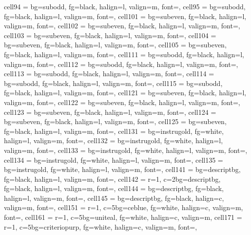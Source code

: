 \documentclass[a4paper,12pt]{article}
\begin{document}
\begin{longtblr}
{  cell{9}{4}  = {bg=subodd,  fg=black, halign=l, valign=m, font=\footnotesize},
  cell{9}{5}  = {bg=subodd,  fg=black, halign=l, valign=m, font=\footnotesize},
  cell{10}{1} = {bg=subeven, fg=black, halign=l, valign=m, font=\footnotesize},
  cell{10}{2} = {bg=subeven, fg=black, halign=l, valign=m, font=\footnotesize},
  cell{10}{3} = {bg=subeven, fg=black, halign=l, valign=m, font=\footnotesize},
  cell{10}{4} = {bg=subeven, fg=black, halign=l, valign=m, font=\footnotesize},
  cell{10}{5} = {bg=subeven, fg=black, halign=l, valign=m, font=\footnotesize},
  cell{11}{1} = {bg=subodd,  fg=black, halign=l, valign=m, font=\footnotesize},
  cell{11}{2} = {bg=subodd,  fg=black, halign=l, valign=m, font=\footnotesize},
  cell{11}{3} = {bg=subodd,  fg=black, halign=l, valign=m, font=\footnotesize},
  cell{11}{4} = {bg=subodd,  fg=black, halign=l, valign=m, font=\footnotesize},
  cell{11}{5} = {bg=subodd,  fg=black, halign=l, valign=m, font=\footnotesize},
  cell{12}{1} = {bg=subeven, fg=black, halign=l, valign=m, font=\footnotesize},
  cell{12}{2} = {bg=subeven, fg=black, halign=l, valign=m, font=\footnotesize},
  cell{12}{3} = {bg=subeven, fg=black, halign=l, valign=m, font=\footnotesize},
  cell{12}{4} = {bg=subeven, fg=black, halign=l, valign=m, font=\footnotesize},
  cell{12}{5} = {bg=subeven, fg=black, halign=l, valign=m, font=\footnotesize},
  cell{13}{1} = {bg=instrugold, fg=white, halign=l, valign=m, font=\footnotesize},
  cell{13}{2} = {bg=instrugold, fg=white, halign=l, valign=m, font=\footnotesize},
  cell{13}{3} = {bg=instrugold, fg=white, halign=l, valign=m, font=\footnotesize},
  cell{13}{4} = {bg=instrugold, fg=white, halign=l, valign=m, font=\footnotesize},
  cell{13}{5} = {bg=instrugold, fg=white, halign=l, valign=m, font=\footnotesize},
  cell{14}{1} = {bg=descriptbg, fg=black, halign=l, valign=m, font=\footnotesize},
  cell{14}{2} = {r=1, c=2}{bg=descriptbg, fg=black, halign=l, valign=m, font=\footnotesize},
  cell{14}{4} = {bg=descriptbg, fg=black, halign=l, valign=m, font=\footnotesize},
  cell{14}{5} = {bg=descriptbg, fg=black, halign=c, valign=m, font=\footnotesize\bfseries},
  cell{15}{1} = {r=1, c=5}{bg=ceblue, fg=white, halign=c, valign=m, font=\small\bfseries},
  cell{16}{1} = {r=1, c=5}{bg=uniteal, fg=white, halign=c, valign=m},
  cell{17}{1} = {r=1, c=5}{bg=criteriopurp, fg=white, halign=c, valign=m, font=\small\bfseries},
}
\end{longtblr}
\end{document}
